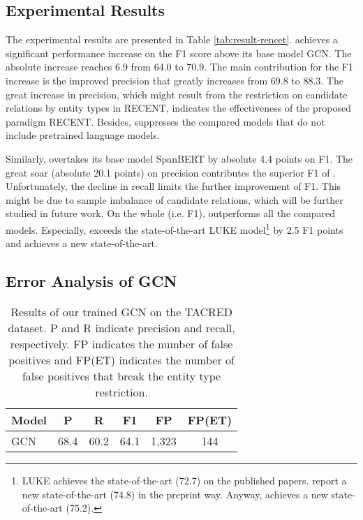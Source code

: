 \documentclass[11pt,a4paper]{article}
\begin{document}
\subsection{Experimental Results}

The experimental results are presented in Table \ref{tab:result-rencet}. 
 achieves a significant performance increase on the F1 score above its base model GCN. 
The absolute increase reaches  6.9 from 64.0 to 70.9. 
The main contribution for the F1 increase is the improved precision  that greatly increases from 69.8 to 88.3.
The great increase in precision, which might result from the restriction on candidate relations by entity types in RECENT, indicates the effectiveness of the proposed paradigm RECENT. 
Besides,  suppresses the compared models that do not include pretrained language models. 

Similarly,  overtakes its base model SpanBERT by absolute 4.4 points on F1.
The great soar (absolute 20.1 points) on precision contributes the superior F1 of . 
Unfortunately, 
the decline in recall limits the further improvement of F1.  
This might be due to sample imbalance  of candidate relations, 
which will be further studied in future work. 
On the whole (i.e. F1),  outperforms all the compared models. 
Especially,  exceeds the state-of-the-art LUKE 
model\footnote{LUKE achieves the state-of-the-art (72.7) on the published papers. 
	\citet{cohen-etal-2020-relation} report a new state-of-the-art (74.8) in the preprint way. 
	Anyway,  achieves a new state-of-the-art (75.2). 
} 
by 2.5 F1 points 
and achieves a new state-of-the-art.

\subsection{Error Analysis of GCN}

\begin{table}[t]
	\centering

		\begin{tabular}{lccc|cc}		
			\toprule
			{Model} & {P} & {R} & {F1} & {FP} & {FP(ET)}   \\ 
			\midrule
			GCN  & 68.4 & 60.2 & 64.1 & 1,323 & 144  \\
			\bottomrule
		\end{tabular}
	\caption{\label{tab:result-gcn} Results of our trained GCN on the TACRED dataset. 
		P and R indicate precision and recall, respectively. 
		FP indicates the number of  false positives 
		and FP(ET) indicates the number of false positives that break the entity type restriction. 
	}
\end{table}
\end{document}
